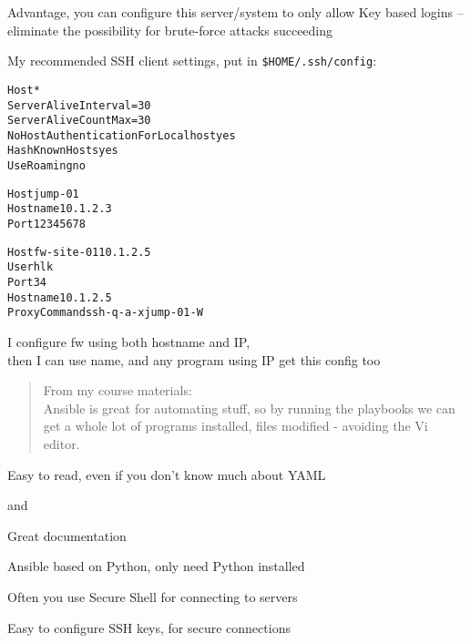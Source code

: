 \documentclass[Screen16to9,17pt]{foils}
\begin{document}

Advantage, you can configure this server/system to only allow Key based logins -- eliminate the possibility for brute-force attacks succeeding


My recommended SSH client settings, put in \verb+$HOME/.ssh/config+:
\begin{alltt}\footnotesize
Host *
    ServerAliveInterval=30
    ServerAliveCountMax=30
    NoHostAuthenticationForLocalhost yes
    HashKnownHosts yes
    UseRoaming no

Host jump-01
  Hostname 10.1.2.3
  Port 12345678

Host fw-site-01 10.1.2.5
  User hlk
  Port 34
  Hostname 10.1.2.5
  ProxyCommand ssh -q -a -x jump-01 -W %h:%p
\end{alltt}

I configure fw using both hostname and IP,\\
then I can use name, and any program using IP get this config too





\begin{quote}
From my course materials:\\
Ansible is great for automating stuff, so by running the playbooks we can get a whole lot of programs installed, files modified - avoiding the Vi editor.
\end{quote}

\begin{list2}
\item Easy to read, even if you don't know much about YAML
\item {} and 
\item Great documentation\\
\end{list2}




\begin{list2}
\item Ansible based on Python, only need Python installed\\
\item Often you use Secure Shell for connecting to servers\\
\item Easy to configure SSH keys, for secure connections
\end{list2}
\end{document}
